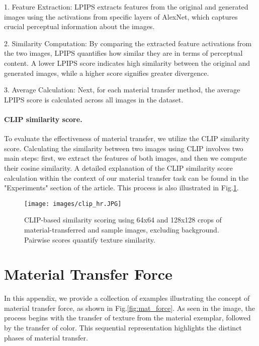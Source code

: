 1. Feature Extraction: LPIPS extracts features from the original and generated images using the activations from specific layers of AlexNet, which captures crucial perceptual information about the images.

2. Similarity Computation: By comparing the extracted feature activations from the two images, LPIPS quantifies how similar they are in terms of perceptual content. A lower LPIPS score indicates high similarity between the original and generated images, while a higher score signifies greater divergence.

3. Average Calculation: Next, for each material transfer method, the average LPIPS score is calculated across all images in the dataset. 

\paragraph{CLIP similarity score.} To evaluate the effectiveness of material transfer, we utilize the CLIP similarity score. Calculating the similarity between two images using CLIP involves two main steps: first, we extract the features of both images, and then we compute their cosine similarity. A detailed explanation of the CLIP similarity score calculation within the context of our material transfer task can be found in the "Experiments" section of the article. This process is also illustrated in Fig.\ref{fig:clip}.


\begin{figure}[t]
  \centering
   
   \texttt{[image: images/clip\_hr.JPG]}

   \caption{CLIP-based similarity scoring using 64x64 and 128x128 crops of material-transferred and sample images, excluding background. Pairwise scores quantify texture similarity.}
   \label{fig:clip}

   \vspace{-5pt}
\end{figure}


\section{Material Transfer Force}
\label{appendix:material_transfer_force}
In this appendix, we provide a collection of examples illustrating the concept of material transfer force, as shown in Fig.\ref{fig:mat_force}. As seen in the image, the process begins with the transfer of texture from the material exemplar, followed by the transfer of color. This sequential representation highlights the distinct phases of material transfer.

